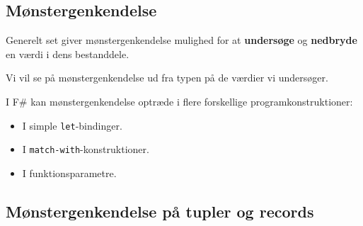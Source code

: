 \documentclass[rgb]{beamer}
\begin{document}
\popmaketitleframe


\subsection{Mønstergenkendelse}

\begin{frame}[fragile]
\begin{footnotesize}


  Generelt set giver mønstergenkendelse mulighed for at \textbf{undersøge} og
  \textbf{nedbryde} en værdi i dens bestanddele.

  \vspace{1ex}

  Vi vil se på mønstergenkendelse ud fra typen på de værdier vi
  undersøger.

  \vspace{1ex}

  I F\# kan mønstergenkendelse optræde i flere forskellige programkonstruktioner:
  \begin{itemize}
  \item I simple \lstinline{let}-bindinger.
  \item I \lstinline{match-with}-konstruktioner.
  \item I funktionsparametre.
  \end{itemize}

\end{footnotesize}
\end{frame}

\subsection{Mønstergenkendelse på tupler og records}
\end{document}

